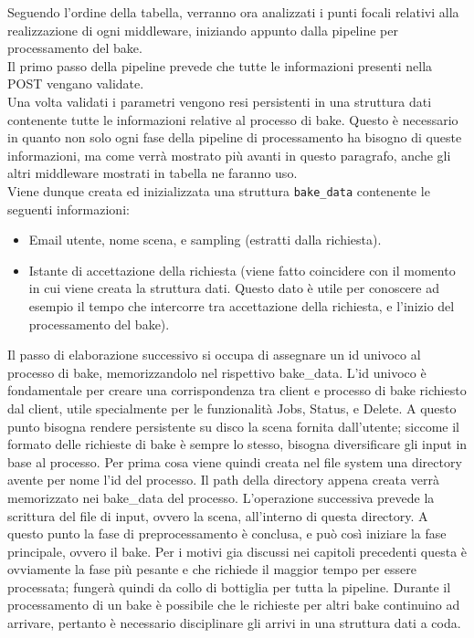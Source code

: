 Seguendo l’ordine della tabella, verranno ora analizzati i punti focali relativi alla realizzazione di ogni middleware, iniziando appunto dalla pipeline per processamento del bake. 
\\
Il primo passo della pipeline prevede che tutte le informazioni presenti nella POST vengano validate.
\\
Una volta validati i parametri vengono resi persistenti in una struttura dati contenente tutte le informazioni relative al processo di bake. Questo è necessario in quanto non solo ogni fase della pipeline di processamento ha bisogno di queste informazioni, ma come verrà mostrato più avanti in questo paragrafo, anche gli altri middleware mostrati in tabella ne faranno uso. 
\\
Viene dunque creata ed inizializzata una struttura \texttt{bake\_data} contenente le seguenti informazioni:
\begin{itemize}
\item Email utente, nome scena, e sampling (estratti dalla richiesta).
\item Istante di accettazione della richiesta (viene fatto coincidere con il momento in cui viene creata la struttura dati. Questo dato è utile per conoscere ad esempio il tempo che intercorre tra accettazione della richiesta, e l’inizio del processamento del bake).
\end{itemize}
Il passo di elaborazione successivo si occupa di assegnare un id univoco al processo di bake, memorizzandolo nel rispettivo bake\_data. L’id univoco è fondamentale per creare una corrispondenza tra client e processo di bake richiesto dal client, utile specialmente per le funzionalità Jobs, Status, e Delete. 
A questo punto bisogna rendere persistente su disco la scena fornita dall’utente; siccome il formato delle richieste di bake è sempre lo stesso, bisogna diversificare gli input in base al processo. Per prima cosa viene quindi creata nel file system una directory avente per nome l’id del processo. Il path della directory appena creata verrà memorizzato nei bake\_data del processo. 
L’operazione successiva prevede la scrittura del file di input, ovvero la scena, all’interno di questa directory. 
A questo punto la fase di preprocessamento è conclusa, e può così iniziare la fase principale, ovvero il bake. Per i motivi gia discussi nei capitoli precedenti questa è ovviamente la fase più pesante e che richiede il maggior tempo per essere processata; fungerà quindi da collo di bottiglia per tutta la pipeline. Durante il processamento di un bake è possibile che le richieste per altri bake continuino ad arrivare, pertanto è necessario disciplinare gli arrivi in una struttura dati a coda. 
